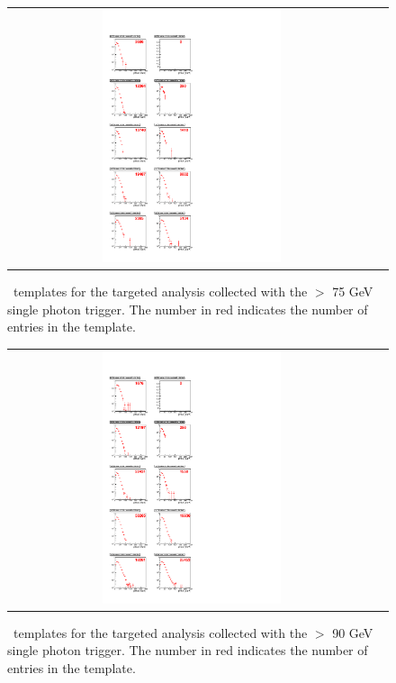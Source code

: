 \clearpage

\begin{figure}[!h]
\begin{center}
\begin{tabular}{cc}
\includegraphics[width=0.5\textwidth]{plots/template_targeted_3.pdf}
\end{tabular}
\caption{
\MET\ templates for the targeted analysis collected with the  \pt $>$ 75 GeV single photon trigger.
The number in red indicates the number of entries in the template.
}
\end{center}
\end{figure}

\clearpage

\begin{figure}[!h]
\begin{center}
\begin{tabular}{cc}
\includegraphics[width=0.5\textwidth]{plots/template_targeted_4.pdf}
\end{tabular}
\caption{
\MET\ templates for the targeted analysis collected with the  \pt $>$ 90 GeV single photon trigger.
The number in red indicates the number of entries in the template.
}
\end{center}
\end{figure}
